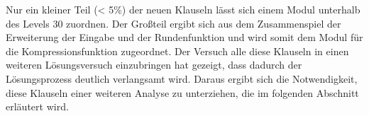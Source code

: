Nur ein kleiner Teil (< 5\%) der neuen Klauseln lässt sich einem Modul unterhalb des Levels 30 zuordnen. Der Großteil ergibt sich aus dem Zusammenspiel
der Erweiterung der Eingabe und der Rundenfunktion und wird somit dem Modul für die Kompressionsfunktion zugeordnet. Der Versuch alle diese Klauseln
in einen weiteren Lösungsversuch einzubringen hat gezeigt, dass dadurch der Lösungsprozess deutlich verlangsamt wird. Daraus ergibt sich die Notwendigkeit,
diese Klauseln einer weiteren Analyse zu unterziehen, die im folgenden Abschnitt erläutert wird.